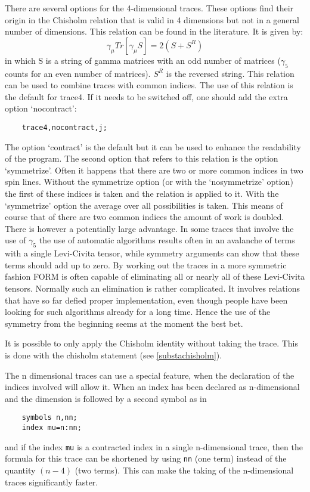 There are several options for the 4-dimensional traces. These options find 
their origin in the Chisholm relation that is valid in 4 
dimensions but not in a general number of dimensions. This relation can be 
found in the literature. It is given by:
\begin{equation}
    \gamma_\mu Tr[\gamma_\mu S] = 2(S + S^R)
\end{equation}
\noindent in which S is a string of gamma matrices with an odd number of 
matrices ($\gamma_5$ counts for an even number of matrices). $S^R$ is the 
reversed string. This relation can be used to combine traces with common 
indices. The use of this relation is the default for trace4. 
If it needs to be switched off, one should add the extra option
`nocontract':
\begin{verbatim}
    trace4,nocontract,j;
\end{verbatim}
The option `contract' is the default but it can be used to 
enhance the readability of the program. The second option that refers to 
this relation is the option `symmetrize'. Often it 
happens that there are two or more common indices in two spin lines. 
Without the symmetrize option (or with the 
`nosymmetrize' option) the first of these indices is 
taken and the relation is applied to it. With the `symmetrize' option 
the average over all possibilities is taken. This means of course that of 
there are two common indices the amount of work is doubled. There is 
however a potentially large advantage. In some traces that involve the use of 
$\gamma_5$ the use of automatic algorithms results often in an avalanche of 
terms with a single Levi-Civita tensor, while symmetry arguments can show 
that these terms should add up to zero. By working out the traces in a more 
symmetric fashion FORM is often capable of eliminating all or nearly all of 
these Levi-Civita tensors. Normally such an elimination is rather 
complicated. It involves relations that have so far defied proper 
implementation, even though people have been looking for such algorithms 
already for a long time. Hence the use of the symmetry from the beginning 
seems at the moment the best bet.

It is possible to only apply the Chisholm identity without 
taking the trace. This is done with the chisholm statement (see 
\ref{substachisholm}). 

The n dimensional traces can use a special feature, when the declaration 
of the indices involved will allow it. When an index has been declared 
as n-dimensional and the dimension is followed by a second symbol as in
\begin{verbatim}
    symbols n,nn;
    index mu=n:nn;
\end{verbatim}
and if the index \verb:mu: is a contracted index in a single 
n-dimensional trace, then the formula for this trace can be shortened by 
using \verb:nn: (one term) instead of the quantity $(n-4)$ (two terms). 
This can make the taking of the n-dimensional traces significantly 
faster.

